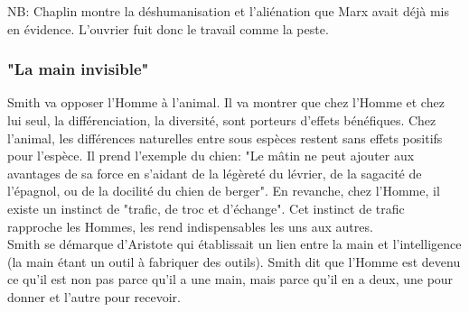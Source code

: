\documentclass[10pt, a4paper, openany]{book}
\begin{document}
NB: Chaplin montre la déshumanisation et l'aliénation que Marx avait déjà mis en évidence. L'ouvrier fuit donc le travail comme la peste. 

\subsubsection{"La main invisible"}

Smith va opposer l'Homme à l'animal. Il va montrer que chez l'Homme et chez lui seul, la différenciation, la diversité, sont porteurs d'effets bénéfiques. Chez l'animal, les différences naturelles entre sous espèces restent sans effets positifs pour l'espèce. Il prend l'exemple du chien: "Le mâtin ne peut ajouter aux avantages de sa force en s'aidant de la légèreté du lévrier, de la sagacité de l'épagnol, ou de la docilité du chien de berger". En revanche, chez l'Homme, il existe un instinct de "trafic, de troc et d'échange". Cet instinct de trafic rapproche les Hommes, les rend indispensables les uns aux autres. \\
Smith se démarque d'Aristote qui établissait un lien entre la main et l'intelligence (la main étant un outil à fabriquer des outils). Smith dit que l'Homme est devenu ce qu'il est non pas parce qu'il a une main, mais parce qu'il en a deux, une pour donner et l'autre pour recevoir. 
\end{document}
